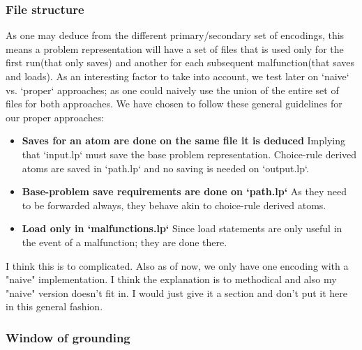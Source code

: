 \documentclass{llncs}
\begin{document}
\subsubsection{File structure}
\color{green}
As one may deduce from the different primary/secondary set of encodings, this means a problem representation will have a set of files that is used only for the first run(that only saves) and another for each subsequent malfunction(that saves and loads). As an interesting factor to take into account, we test later on `naive` vs. `proper` approaches; as one could naively use the union of the entire set of files for both approaches. We have chosen to follow these general guidelines for our proper approaches:
\begin{itemize}
	\item  \textbf{Saves for an atom are done on the same file it is deduced} Implying that `input.lp` must save the base problem representation. Choice-rule derived atoms are saved in `path.lp` and no saving is needed on `output.lp`. 
	\item  \textbf{Base-problem save requirements are done on `path.lp`} As they need to be forwarded always, they behave akin to choice-rule derived atoms.  
	\item  \textbf{Load only in `malfunctions.lp`}  Since load statements are only useful in the event of a malfunction; they are done there. 
\end{itemize}
\color{black} \color{gray} I think this is to complicated. Also as of now, we only have one encoding with a "naive" implementation. I think the explanation is to methodical and also my "naive" version doesn't fit in. I would just give it a section and don't put it here in this general fashion. \color{black}
\subsubsection{Window of grounding}
\end{document}
